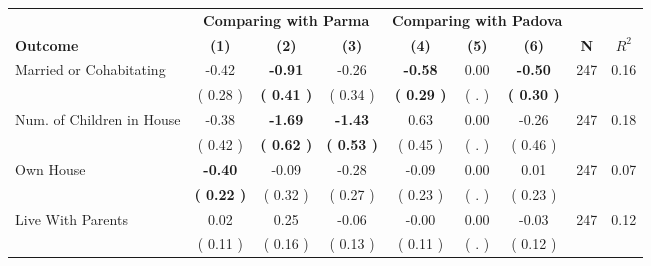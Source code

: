 \begin{tabular}{lcccccccc}
\toprule
 & \multicolumn{3}{c}{\textbf{Comparing with Parma}} & \multicolumn{3}{c}{\textbf{Comparing with Padova}} & \\
\cmidrule(lr){2-4} \cmidrule(lr){5-7} 
 \textbf{Outcome} & \textbf{(1)} & \textbf{(2)} & \textbf{(3)} & \textbf{(4)} & \textbf{(5)} & \textbf{(6)} & \textbf{N} & \textbf{$ R^2$} \\
\midrule
Married or Cohabitating &     -0.42 & \textbf{    -0.91} &     -0.26 & \textbf{    -0.58} &      0.00 & \textbf{    -0.50} & 247 &       0.16 \\ 
 & (     0.28 ) & \textbf{(     0.41 )} & (     0.34 ) & \textbf{(     0.29 )} & (        . ) & \textbf{(     0.30 )} & \\
Num. of Children in House &     -0.38 & \textbf{    -1.69} & \textbf{    -1.43} &      0.63 &      0.00 &     -0.26 & 247 &       0.18 \\ 
 & (     0.42 ) & \textbf{(     0.62 )} & \textbf{(     0.53 )} & (     0.45 ) & (        . ) & (     0.46 ) & \\
Own House & \textbf{    -0.40} &     -0.09 &     -0.28 &     -0.09 &      0.00 &      0.01 & 247 &       0.07 \\ 
 & \textbf{(     0.22 )} & (     0.32 ) & (     0.27 ) & (     0.23 ) & (        . ) & (     0.23 ) & \\
Live With Parents &      0.02 &      0.25 &     -0.06 &     -0.00 &      0.00 &     -0.03 & 247 &       0.12 \\ 
 & (     0.11 ) & (     0.16 ) & (     0.13 ) & (     0.11 ) & (        . ) & (     0.12 ) & \\
\bottomrule
\end{tabular}
